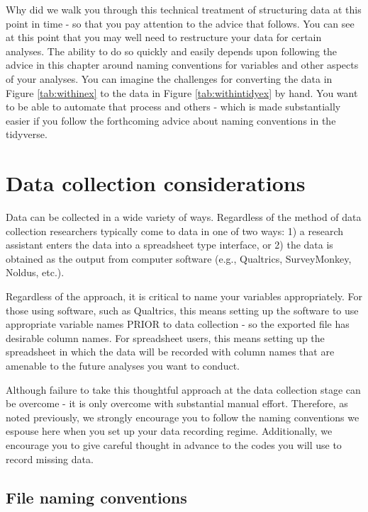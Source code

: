 \documentclass[
]{krantz}
\begin{document}
Why did we walk you through this technical treatment of structuring data at this point in time - so that you pay attention to the advice that follows. You can see at this point that you may well need to restructure your data for certain analyses. The ability to do so quickly and easily depends upon following the advice in this chapter around naming conventions for variables and other aspects of your analyses. You can imagine the challenges for converting the data in Figure \ref{tab:withinex} to the data in Figure \ref{tab:withintidyex} by hand. You want to be able to automate that process and others - which is made substantially easier if you follow the forthcoming advice about naming conventions in the tidyverse.

\hypertarget{data-collection-considerations}{%
\section{Data collection considerations}\label{data-collection-considerations}}

Data can be collected in a wide variety of ways. Regardless of the method of data collection researchers typically come to data in one of two ways: 1) a research assistant enters the data into a spreadsheet type interface, or 2) the data is obtained as the output from computer software (e.g., Qualtrics, SurveyMonkey, Noldus, etc.).

Regardless of the approach, it is critical to name your variables appropriately. For those using software, such as Qualtrics, this means setting up the software to use appropriate variable names PRIOR to data collection - so the exported file has desirable column names. For spreadsheet users, this means setting up the spreadsheet in which the data will be recorded with column names that are amenable to the future analyses you want to conduct.

Although failure to take this thoughtful approach at the data collection stage can be overcome - it is only overcome with substantial manual effort. Therefore, as noted previously, we strongly encourage you to follow the naming conventions we espouse here when you set up your data recording regime. Additionally, we encourage you to give careful thought in advance to the codes you will use to record missing data.

\hypertarget{file-naming-conventions}{%
\subsection{File naming conventions}\label{file-naming-conventions}}
\end{document}
